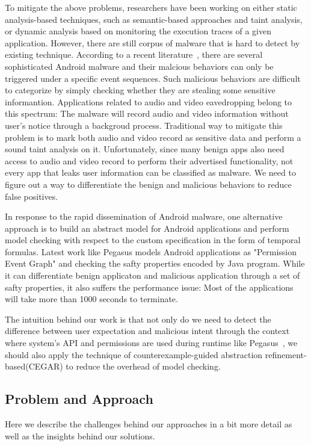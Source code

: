 \documentclass{article}
\begin{document}
To mitigate the above problems, researchers have been working on either 
static analysis-based techniques, such as semantic-based approaches and taint analysis, 
or dynamic analysis based on monitoring the execution traces of a 
given application. However, there are still corpus of malware that is hard to detect 
by existing technique. According to a recent literature~\cite{pegasus}, there are
several sophisticated Android malware and their malcious behaviors can only 
be triggered under a specific event sequences. Such malicious behaviors 
are difficult to categorize by simply checking whether they are stealing 
some sensitive informantion. Applications related to audio and video eavedropping 
belong to this spectrum: The malware will record audio and video information
without user's notice through a backgroud process. Traditional way to 
mitigate this problem is to mark both audio and video record as sensitive
data and perform a sound taint analysis on it. 
Unfortunately, since many benign apps  also need access to audio and video record 
to perform their advertised functionality, not every app that
leaks user information can be classified as malware. We need to figure out
a way to differentiate the benign and malicious behaviors to reduce false positives.

In response to the  rapid dissemination of 
Android malware, one alternative approach is to build an abstract
model for Android applications and perform model checking with respect
to the custom specification in the form of temporal formulas. 
Latest work like Pegasus\cite{pegasus} models Android applications as "Permission Event Graph"
and checking the safty properties encoded by Java program. While it can 
differentiate benign applicaton and malicious application through a set 
of safty properties, it also suffers the performance issue: Most of the 
applications will take more than 1000 seconds to terminate. 

The intuition behind our work is that not only do we need to detect
the difference between user expectation and malicious intent through the 
context where system's API and permissions are used during runtime like 
Pegasus~\cite{pegasus},  we should also apply the technique of  
counterexample-guided abstraction refinement-based(CEGAR) to reduce 
the overhead of model checking.

\subsection{Problem and Approach}
Here we describe the challenges behind our approaches in a bit more detail
as well as the insights behind our solutions.
\end{document}
